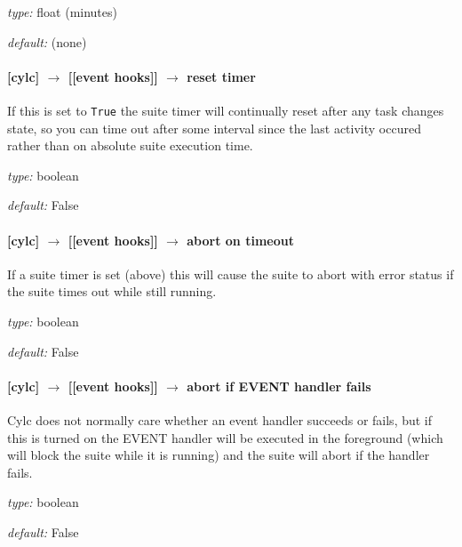 \begin{myitemize}
    \item {\em type:} float (minutes)
    \item {\em default:} (none)
\end{myitemize}

\paragraph[reset timer]{[cylc] $\rightarrow$ [[event hooks]] $\rightarrow$ reset timer}

If this is set to \lstinline=True= the suite timer will continually
reset after any task changes state, so you can time out after some
interval since the last activity occured rather than on absolute suite
execution time.

\begin{myitemize}
    \item {\em type:} boolean
    \item {\em default:} False
\end{myitemize}

\paragraph[abort on timeout]{[cylc] $\rightarrow$ [[event hooks]] $\rightarrow$ abort on timeout}

If a suite timer is set (above) this will cause the suite to abort with
error status if the suite times out while still running.

\begin{myitemize}
    \item {\em type:} boolean
    \item {\em default:} False
\end{myitemize}

\paragraph[abort if startup handler fails]{[cylc] $\rightarrow$ [[event hooks]] $\rightarrow$ abort if EVENT handler fails}

Cylc does not normally care whether an event handler succeeds or fails,
but if this is turned on the EVENT handler will be executed in the
foreground (which will block the suite while it is running) and the
suite will abort if the handler fails.

\begin{myitemize}
    \item {\em type:} boolean
    \item {\em default:} False
\end{myitemize}

